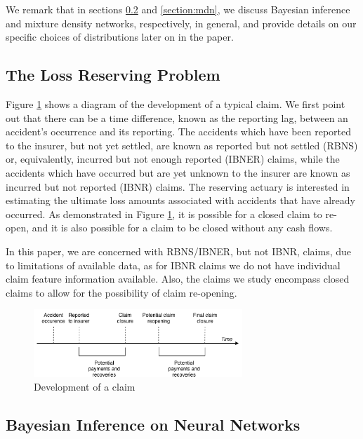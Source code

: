 \documentclass{article}
\begin{document}
We remark that in sections \ref{section:bnn} and \ref{section:mdn}, we discuss Bayesian inference and mixture density networks, respectively, in general, and provide details on our specific choices of distributions later on in the paper.

\subsection{The Loss Reserving Problem}

Figure \ref{fig:claimrunoff} shows a diagram of the development of a typical claim. We first point out that there can be a time difference, known as the reporting lag, between an accident's occurrence and its reporting. The accidents which have been reported to the insurer, but not yet settled, are known as reported but not settled (RBNS) or, equivalently, incurred but not enough reported (IBNER) claims, while the accidents which have occurred but are yet unknown to the insurer are known as incurred but not reported (IBNR) claims. The reserving actuary is interested in estimating the ultimate loss amounts associated with accidents that have already occurred. As demonstrated in Figure \ref{fig:claimrunoff}, it is possible for a closed claim to re-open, and it is also possible for a claim to be closed without any cash flows.

In this paper, we are concerned with RBNS/IBNER, but not IBNR, claims, due to limitations of available data, as for IBNR claims we do not have individual claim feature information available. Also, the claims we study encompass closed claims to allow for the possibility of claim re-opening.

\begin{figure}
  \begin{center}
    \includegraphics[width=0.7\textwidth]{images/claim_runoff.png}
  \end{center}
  \caption{Development of a claim}
  \label{fig:claimrunoff}
\end{figure}

\subsection{Bayesian Inference on Neural Networks} \label{section:bnn}
\end{document}
